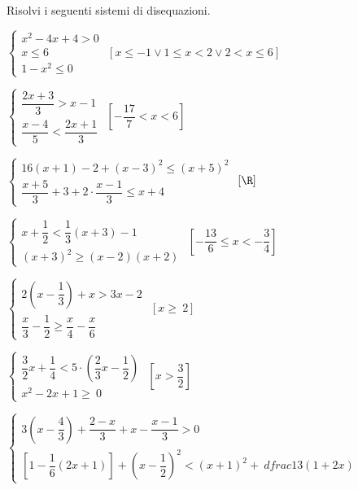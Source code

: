 \begin{esercizio}[*]
 \label{ese:21.41}
 Risolvi i seguenti sistemi di disequazioni.
 \begin{enumeratea}
\item \(\left\{\begin{array}{l}x^2-4x+4>0\\x\le 6\\1-x^2\le 
0\end{array}\right.\)
 \hfill \(\left[x\le -1\vee 1\le x<2\vee 2<x\le 6\right]\)
\item { \(\left\{\begin{array}{l}
\dfrac{2x+3}{3}>x-1\\
\dfrac{x-4}{5}<\dfrac{2x+1}{3}
\end{array}\right.\)}
 \hfill \(\left[-{\dfrac{17}{7}}<x<6\right]\)
\item { \(\left\{\begin{array}{l}
16(x+1)-2+(x-3)^{2}\le(x+5)^{2}\\
\dfrac{x+5}{3}+3+2\cdot\dfrac{x-1}{3}\le x+4
\end{array}\right.\)}
 \hfill \(\left[\R\right]\)
\item \(\left\{\begin{array}{l}
x+\dfrac{1}{2}<\dfrac{1}{3}(x+3)-1\\
(x+3)^{2}\ge (x-2)(x+2)
\end{array}\right.\)
 \hfill \(\left[-{\dfrac{13}{6}}\le x<-{\dfrac{3}{4}}\right]\)
\item { \(\left\{\begin{array}{l}
2\left(x-\dfrac{1}{3}\right)+x>3x-2\\
\dfrac{x}{3}-\dfrac{1}{2}\ge \dfrac{x}{4}-\dfrac{x}{6}
  \end{array}\right.\)}
 \hfill \(\left[x\ge~2\right]\)
\item \(\left\{\begin{array}{l}
  \dfrac{3}{2}x+\dfrac{1}{4}<5\cdot\left(\dfrac{2}{3}x-\dfrac{1}{2}\right)\\
  x^2-2x+1\ge~0
\end{array}\right.\)
 \hfill \(\left[x>\dfrac{3}{2}\right]\)
\item { \(\left\{\begin{array}{l}
3\left(x-\dfrac{4}{3}\right)+\dfrac{2-x}{3}+x-\dfrac{x-1}{3}>0\\
\left[1-\dfrac{1}{6}(2x+1)\right]+\left(x-\dfrac{1}{2}\right)^{2}<(x+1)^{2}+\
dfrac{1}{3}(1+2x)
   \end{array}\right.\)}

\end{enumeratea}
\end{esercizio}
